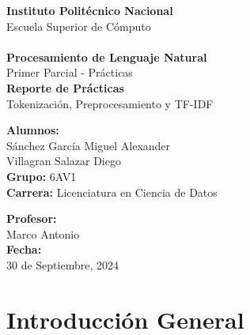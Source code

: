\documentclass[12pt,a4paper]{article}
\begin{document}
\begin{titlepage}
    \centering
    \vspace*{2cm}
    
    {\huge\bfseries Instituto Politécnico Nacional}\\[0.5cm]
    {\Large Escuela Superior de Cómputo}\\[1.5cm]
    
    \\[1cm]
    
    {\huge\bfseries Procesamiento de Lenguaje Natural}\\[0.5cm]
    {\Large Primer Parcial - Prácticas}\\[2cm]
    
    {\Large\bfseries Reporte de Prácticas}\\[0.5cm]
    {\large Tokenización, Preprocesamiento y TF-IDF}\\[2cm]
    
    \begin{minipage}{0.4\textwidth}
        \begin{flushleft}
            \textbf{Alumnos:}\\
            Sánchez García Miguel Alexander\\[0.5cm]
            Villagran Salazar Diego\\[0.5cm]
            \textbf{Grupo:} 6AV1\\
            \textbf{Carrera:} Licenciatura en Ciencia de Datos
        \end{flushleft}
    \end{minipage}
    \hfill
    \begin{minipage}{0.4\textwidth}
        \begin{flushright}
            \textbf{Profesor:}\\
            Marco Antonio\\[0.5cm]
            \textbf{Fecha:}\\
            30 de Septiembre, 2024
        \end{flushright}
    \end{minipage}
    
    \vfill
\end{titlepage}

\tableofcontents
\newpage

\section{Introducción General}
\end{document}
